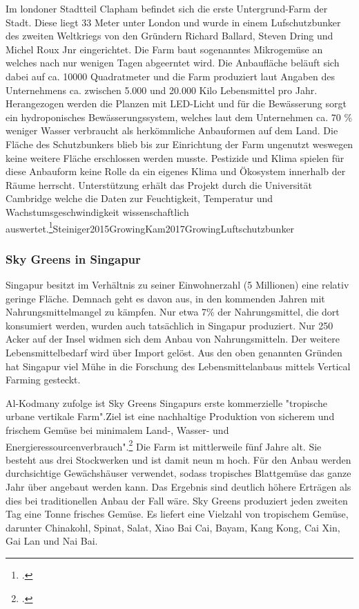 \documentclass{scrartcl}
\begin{document}
Im londoner Stadtteil Clapham befindet sich die erste Untergrund-Farm der Stadt. Diese liegt 33 Meter unter London und wurde in einem Lufschutzbunker des zweiten Weltkriegs von den Gründern  Richard Ballard, Steven Dring und Michel Roux Jnr eingerichtet. Die Farm baut sogenanntes Mikrogemüse an welches nach nur wenigen Tagen abgeerntet wird. Die Anbaufläche beläuft sich dabei auf ca. 10000 Quadratmeter und die Farm produziert laut Angaben des Unternehmens ca. zwischen 5.000 und 20.000 Kilo Lebensmittel pro Jahr. Herangezogen werden die Planzen mit LED-Licht und für die Bewässerung sorgt ein hydroponisches Bewässerungssystem, welches laut dem Unternehmen ca. 70 \% weniger Wasser verbraucht als herkömmliche Anbauformen auf dem Land. Die Fläche des Schutzbunkers blieb bis zur Einrichtung der Farm ungenutzt weswegen keine weitere Fläche erschlossen werden musste. Pestizide und Klima spielen für diese Anbauform keine Rolle da ein eigenes Klima und Ökosystem innerhalb der Räume herrscht. Unterstützung erhält das Projekt durch die Universität Cambridge welche die Daten zur Feuchtigkeit, Temperatur und Wachstumsgeschwindigkeit wissenschaftlich auswertet.\footcite[Vgl.]{Lepies2015AusTisch}{Steiniger2015GrowingKam}{2017GrowingLuftschutzbunker}

\subsubsection{Sky Greens in Singapur}

Singapur besitzt im Verhältnis zu seiner Einwohnerzahl (5 Millionen)  eine relativ geringe Fläche. Demnach geht es davon aus, in den kommenden Jahren mit Nahrungsmittelmangel zu kämpfen. 
Nur etwa 7\% der Nahrungsmittel, die dort konsumiert werden, wurden auch tatsächlich in Singapur produziert. Nur 250 Acker auf der Insel widmen sich dem Anbau von Nahrungsmitteln. Der weitere Lebensmittelbedarf wird über Import gelöst. Aus den oben genannten Gründen hat Singapur viel Mühe in die Forschung des Lebensmittelanbaus mittels Vertical Farming gesteckt. 

Al-Kodmany zufolge ist Sky Greens Singapurs erste kommerzielle "tropische urbane vertikale Farm".Ziel ist eine nachhaltige Produktion von sicherem und frischem Gemüse bei minimalem Land-, Wasser- und Energieressourcenverbrauch".\footcite{SkyGreens} Die Farm ist mittlerweile fünf Jahre alt. Sie besteht aus drei Stockwerken und ist damit neun m hoch. Für den Anbau werden durchsichtige Gewächshäuser verwendet, sodass tropisches Blattgemüse das ganze Jahr über angebaut werden kann. Das Ergebnis sind deutlich höhere Erträgen als dies bei traditionellen Anbau der Fall wäre. Sky Greens produziert jeden zweiten Tag eine Tonne frisches Gemüse. Es liefert eine Vielzahl von tropischem Gemüse, darunter Chinakohl, Spinat, Salat, Xiao Bai Cai, Bayam, Kang Kong, Cai Xin, Gai Lan und Nai Bai. 
\end{document}
